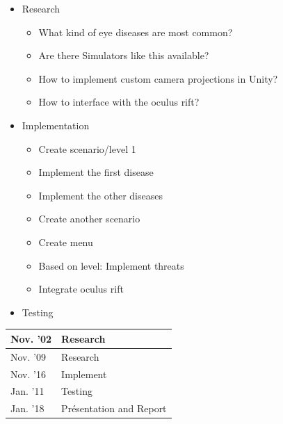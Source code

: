 \documentclass{acm_proc_article-sp}
\newcommand{\todo}[1]{\textcolor{Red}{#1}}
\begin{document}
\begin{itemize}

  \item Research

  \begin{itemize}

    \item What kind of eye diseases are most common?
	
	\item Are there Simulators like this available?

    \item How to implement custom camera projections in Unity?

    \item How to interface with the oculus rift?

        
  \end{itemize}

  \item Implementation

  \begin{itemize}

    \item Create scenario/level 1

    \item Implement the first disease

    \item Implement the other diseases 

    \item Create another scenario

    \item Create menu

    \item Based on level: Implement threats

    \item Integrate oculus rift

  \end{itemize}

  \item Testing

\end{itemize}


\begin{center}

  \begin{tabular}{|l|p{6.5cm}|}

    \hline

    Nov. '02 & Research \\ \hline

    Nov. '09 & Research  \\ \hline

    Nov. '16 & Implement \\ \hline

    Jan. '11 & Testing  \\ \hline

    Jan. '18 & Présentation and Report \\

    \hline

  \end{tabular}

\end{center}

\todo{}
\printbibliography

\balancecolumns
\end{document}

